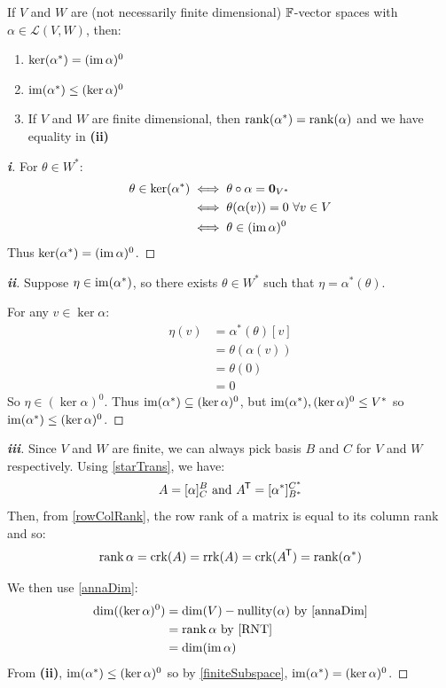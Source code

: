 \documentclass[../main.tex]{subfiles}
\begin{document}
\begin{proposition}
  If $V$ and $W$ are (not necessarily finite dimensional) $\mathbb{F}$-vector spaces with $\alpha \in \mathcal{L}(V, W)$, then:
  \begin{enumerate}
    \item $\ker(\alpha^{*}) = (\operatorname{im} \alpha)^{0}$
    \item $\operatorname{im}(\alpha^{*}) \leq (\ker \alpha)^{0}$
    \item If $V$ and $W$ are finite dimensional, then $\operatorname{rank}(\alpha^{*}) = \operatorname{rank}(\alpha)$ and we have equality in \textbf{(ii)}
  \end{enumerate}
\end{proposition}
\begin{proof}[\textbf{i}]
  For $\theta \in W^{*}$:
  \begin{align*}
    \theta \in \ker(\alpha^{*}) &\iff \theta \circ \alpha = \mathbf{\bm{0}}_{V^{*}} \\
                                &\iff \theta(\alpha(v)) = 0\ \forall v \in V \\
                                &\iff \theta \in (\operatorname{im} \alpha)^{0}
  \end{align*}
  Thus $\ker(\alpha^{*}) = (\operatorname{im} \alpha)^{0}$.
\end{proof}
\begin{proof}[\textbf{ii}]
  Suppose $\eta \in \operatorname{im}(\alpha^{*})$, so there exists $\theta \in W^{*}$ such that $\eta = \alpha^{*}(\theta)$.

  For any $v \in \ker \alpha$:
  \begin{align*}
    \eta(v) &= \alpha^{*}(\theta)[v] \\
            &= \theta(\alpha(v)) \\
            &= \theta(0) \\
            &= 0
  \end{align*}
  So $\eta \in (\ker \alpha)^{0}$.
  Thus $\operatorname{im}(\alpha^{*}) \subseteq (\ker \alpha)^{0}$, but $\operatorname{im}(\alpha^{*}), (\ker \alpha)^{0} \leq V^{*}$ so $\operatorname{im}(\alpha^{*}) \leq (\ker \alpha)^{0}$.
\end{proof}
\begin{proof}[\textbf{iii}]
  Since $V$ and $W$ are finite, we can always pick basis $B$ and $C$ for $V$ and $W$ respectively.
  Using \cref{starTrans}, we have:
  \[
    A = [\alpha]^{B}_{C} \text{ and } A^{{\mkern-1.5mu\mathsf{T}}} = [\alpha^{*}]^{C^{*}}_{B^{*}}
  \]
  Then, from \cref{rowColRank}, the row rank of a matrix is equal to its column rank and so:
  \[
    \operatorname{rank} \alpha = \operatorname{crk}(A) = \operatorname{rrk}(A) = \operatorname{crk}(A^{{\mkern-1.5mu\mathsf{T}}}) = \operatorname{rank}(\alpha^{*})
  \]

  We then use \cref{annaDim}:
  \begin{align*}
    \dim((\ker \alpha)^{0}) &= \dim(V) - \nullity(\alpha) \text{ by \cref{annaDim}} \\
                            &= \rank \alpha \text{ by \cref{RNT}} \\
                            &= \dim(\im \alpha)
  \end{align*}
  From \textbf{(ii)}, $\operatorname{im}(\alpha^{*}) \leq (\ker \alpha)^{0}$ so by \cref{finiteSubspace}, $\operatorname{im}(\alpha^{*}) = (\ker \alpha)^{0}$.
\end{proof}
\end{document}
